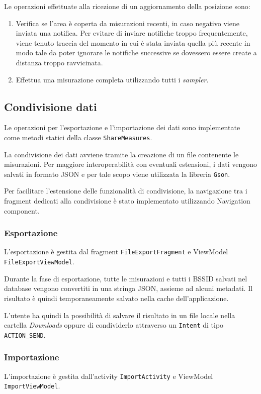 \documentclass[11pt]{article}
\begin{document}
Le operazioni effettuate alla ricezione di un aggiornamento della posizione sono:
\begin{enumerate}
  \item Verifica se l'area è coperta da misurazioni recenti, in caso negativo viene inviata una notifica.
        Per evitare di inviare notifiche troppo frequentemente, viene tenuto traccia del momento in cui è stata inviata quella più recente in modo tale da poter ignorare le notifiche successive se dovessero essere create a distanza troppo ravvicinata.
  \item Effettua una misurazione completa utilizzando tutti i \textit{sampler}.
\end{enumerate}



\subsection{Condivisione dati}

Le operazioni per l'esportazione e l'importazione dei dati sono implementate come metodi statici della classe \texttt{ShareMeasures}.

La condivisione dei dati avviene tramite la creazione di un file contenente le misurazioni.
Per maggiore interoperabilità con eventuali estensioni, i dati vengono salvati in formato JSON e per tale scopo viene utilizzata la libreria \texttt{Gson}.

Per facilitare l'estensione delle funzionalità di condivisione, la navigazione tra i fragment dedicati alla condivisione è stato implementato utilizzando Navigation component.

\subsubsection{Esportazione}
L'esportazione è gestita dal fragment \texttt{FileExportFragment} e ViewModel \texttt{FileExportViewModel}.

Durante la fase di esportazione, tutte le misurazioni e tutti i BSSID salvati nel database vengono convertiti in una stringa JSON, assieme ad alcuni metadati. Il risultato è quindi temporaneamente salvato nella cache dell'applicazione.

L'utente ha quindi la possibilità di salvare il risultato in un file locale nella cartella \textit{Downloads} oppure di condividerlo attraverso un \texttt{Intent} di tipo \texttt{ACTION\_SEND}.


\subsubsection{Importazione}
L'importazione è gestita dall'activity \texttt{ImportActivity} e ViewModel \texttt{ImportViewModel}.
\end{document}
